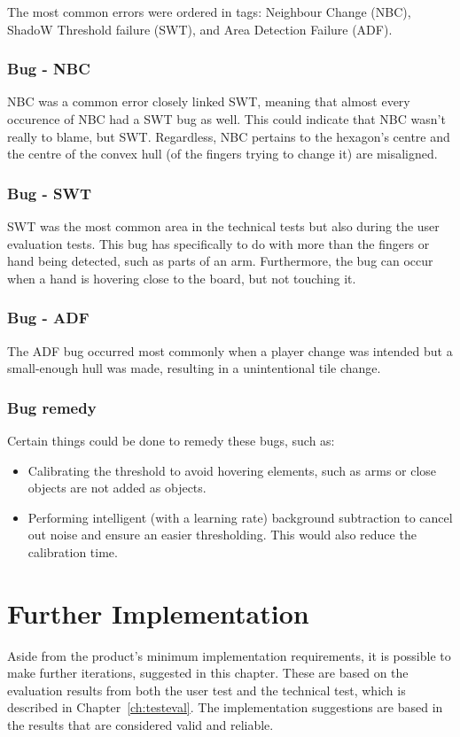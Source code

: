 The most common errors were ordered in tags: Neighbour Change (NBC), ShadoW Threshold failure (SWT), and Area Detection Failure (ADF). 
\subsubsection*{Bug - NBC} 
NBC was a common error closely linked SWT, meaning that almost every occurence of NBC had a SWT bug as well. This could indicate that NBC wasn't really to blame, but SWT. Regardless, NBC pertains to the hexagon's centre and the centre of the convex hull (of the fingers trying to change it) are misaligned.
\subsubsection*{Bug - SWT} 
SWT was the most common area in the technical tests but also during the user evaluation tests. This bug has specifically to do with more than the fingers or hand being detected, such as parts of an arm. Furthermore, the bug can occur when a hand is hovering close to the board, but not touching it.
\subsubsection*{Bug - ADF} 
The ADF bug occurred most commonly when a player change was intended but a small-enough hull was made, resulting in a unintentional tile change.
\subsubsection*{Bug remedy}
Certain things could be done to remedy these bugs, such as:
\begin{itemize}
	\item Calibrating the threshold to avoid hovering elements, such as arms or close objects are not added as objects.
	\item Performing intelligent (with a learning rate) background subtraction to cancel out noise and ensure an easier thresholding. This would also reduce the calibration time.
\end{itemize}

\section{Further Implementation}
Aside from the product's minimum implementation requirements, it is possible to make further iterations, suggested in this chapter. These are based on the evaluation results from both the user test and the technical test, which is described in Chapter~\ref{ch:testeval}. The implementation suggestions are based in the results that are considered valid and reliable.

